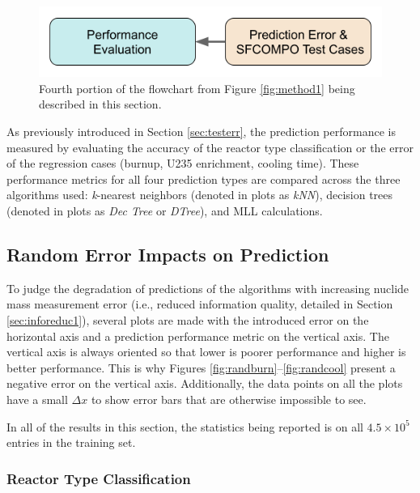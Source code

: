 
\begin{figure}[H]
  \centering
  \includegraphics[width=0.7\linewidth]{./chapters/exp1/methodology1_4.png}
  \caption[Fourth portion of the flowchart from Figure \ref{fig:method1}]
          {Fourth portion of the flowchart from Figure \ref{fig:method1} being 
           described in this section.}
\end{figure}

As previously introduced in Section \ref{sec:testerr}, the prediction
performance is measured by evaluating the accuracy of the reactor type
classification or the error of the regression cases (burnup, \gls{U235}
enrichment, cooling time).  These performance metrics for all four prediction
types are compared across the three algorithms used: \textit{k}-nearest
neighbors (denoted in plots as \textit{kNN}), decision trees (denoted in plots
as \textit{Dec Tree} or \textit{DTree}), and \gls{MLL} calculations.  

\subsection{Random Error Impacts on Prediction}
\label{sec:randerr}

To judge the degradation of predictions of the algorithms with increasing
nuclide mass measurement error (i.e., reduced information quality, detailed in
Section \ref{sec:inforeduc1}), several plots are made with the introduced error
on the horizontal axis and a prediction performance metric on the
vertical axis.  The vertical axis is always oriented so that lower is
poorer performance and higher is better performance. This is why Figures
\ref{fig:randburn}--\ref{fig:randcool} present a negative error on the
vertical axis. Additionally, the data points on all the plots have a small
$\Delta x$ to show error bars that are otherwise impossible to see.

In all of the results in this section, the statistics being reported is on all
$4.5 \times 10^5$ entries in the training set.

\subsubsection{Reactor Type Classification}
\label{sec:randerrA}

